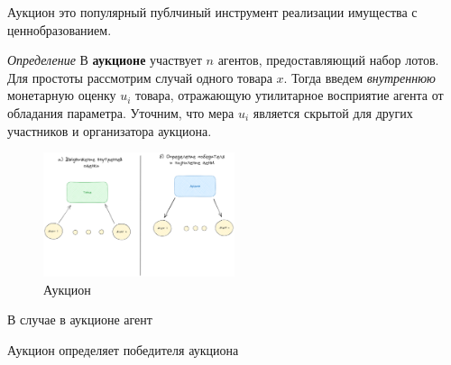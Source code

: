 Аукцион это популярный публчиный инструмент реализации имущества с ценнобразованием.


\textit{Определение} В \textbf{аукционе} участвует $n$ агентов, предоставляющий набор лотов. 
Для простоты рассмотрим случай одного товара $x$. 
Тогда введем \textit{внутреннюю} монетарную оценку $u_i$ товара, отражающую утилитарное восприятие агента от обладания параметра. Уточним, что мера $u_i$ является скрытой для других участников и организатора аукциона.


\begin{figure}[h]
    \centering
    \includegraphics[width=0.5\textwidth]{assets/auctions/setting.excalidraw.png}
    \caption{Аукцион}
\end{figure}



В случае  в аукционе агент


Аукцион определяет победителя аукциона